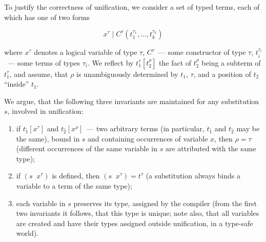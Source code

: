 \documentclass[10pt, oneside, nocopyrightspace]{sigplanconf}
\begin{document}
To justify the correctness of unification, we consider a set of typed terms, each of which
has one of two forms

$$
x^\tau \mid C^\tau(t_1^{\tau_1},\dots,t_k^{\tau_k})
$$

\noindent where $x^\tau$ denotes a logical variable of type $\tau$, 
$C^\tau$~--- some constructor of type $\tau$, $t_i^{\tau_i}$~--- some terms of types $\tau_i$.
We reflect by $t_1^\tau[t_2^\rho]$ the fact of $t_2^\rho$ being a subterm of $t_1^\tau$, and
assume, that $\rho$ is unambiguously determined by $t_1$, $\tau$, and a position of $t_2$ 
``inside'' $t_1$.

\begin{comment}
Outside unification the compiler maintains typing, which means, that all 
terms, subterms, and variables agree in their types in all contexts. However, as 
our implementation resorts to unsafe features, we have to make this work for unification
code on our own.
\end{comment}

We argue, that the following three invariants are maintained for any substitution $s$, involved 
in unification:

\begin{enumerate}
\item if \mbox{$t_1^{\_}[x^{\tau}]$} and \mbox{$t_2^{\_}[x^{\rho}]$}~--- two arbitrary terms (in particular, 
$t_1^{\_}$ and $t_2^{\_}$ may be the same), bound in $s$ and containing occurrences of variable $x$, 
then $\rho=\tau$ (different occurrences of the same variable in $s$ are attributed with the same type);

\item if \mbox{$(s\;\;x^\tau)$} is defined, then \mbox{$(s\;\;x^\tau) = t^\tau$} (a substitution always
binds a variable to a term of the same type);

\item each variable in $s$ preserves its type, assigned by the compiler (from the first two invariants 
it follows, that this type is unique; note also, that all variables are created and have their 
types assigned outside unification, in a type-safe world).
\end{enumerate}
\end{document}
